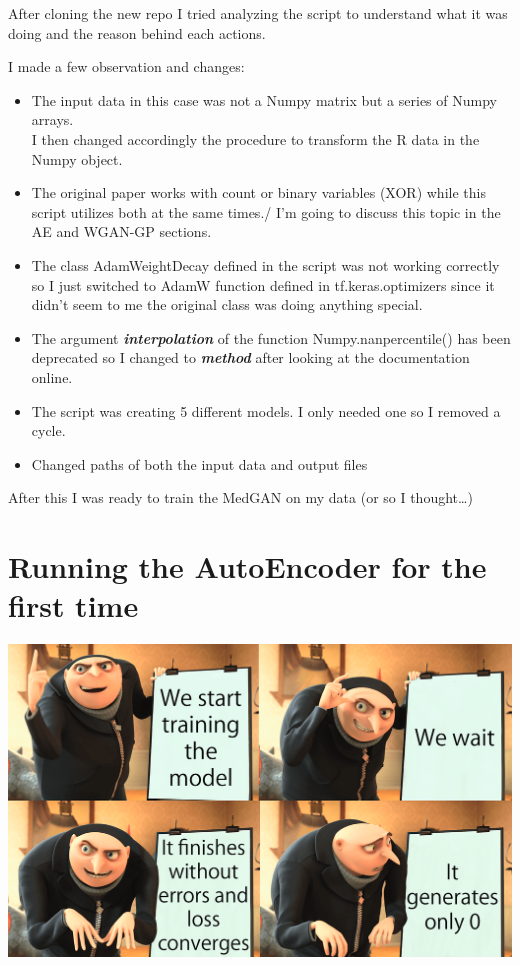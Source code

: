 \documentclass[
  letterpaper,
  DIV=11,
  numbers=noendperiod]{scrreprt}
\providecommand{\tightlist}{%
  \setlength{\itemsep}{0pt}\setlength{\parskip}{0pt}}\usepackage{longtable,booktabs,array}
\begin{document}
After cloning the new repo I tried analyzing the script to understand
what it was doing and the reason behind each actions.

I made a few observation and changes:

\begin{itemize}
\tightlist
\item
  The input data in this case was not a Numpy matrix but a series of
  Numpy arrays.\\
  I then changed accordingly the procedure to transform the R data in
  the Numpy object.
\item
  The original paper works with count or binary variables (XOR) while
  this script utilizes both at the same times./ I'm going to discuss
  this topic in the AE and WGAN-GP sections.
\item
  The class AdamWeightDecay defined in the script was not working
  correctly so I just switched to AdamW function defined in
  tf.keras.optimizers since it didn't seem to me the original class was
  doing anything special.
\item
  The argument \textbf{\emph{interpolation}} of the function
  Numpy.nanpercentile() has been deprecated so I changed to
  \textbf{\emph{method}} after looking at the documentation online.
\item
  The script was creating 5 different models. I only needed one so I
  removed a cycle.
\item
  Changed paths of both the input data and output files
\end{itemize}

After this I was ready to train the MedGAN on my data (or so I
thought\ldots)

\hypertarget{running-the-autoencoder-for-the-first-time}{%
\chapter{Running the AutoEncoder for the first
time}\label{running-the-autoencoder-for-the-first-time}}

\includegraphics{ae_0.png}
\end{document}
